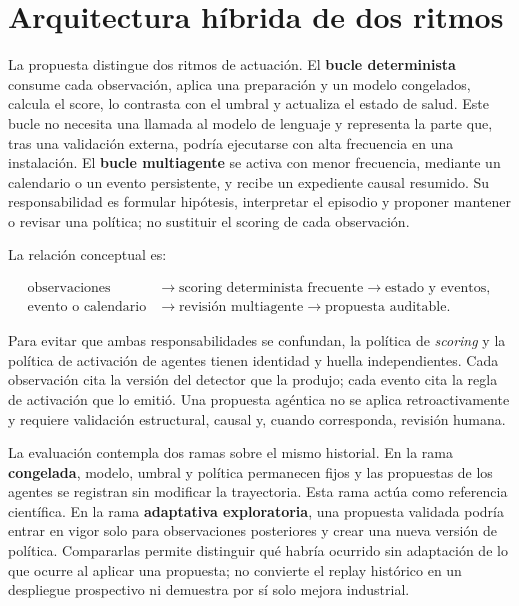 \section{Arquitectura híbrida de dos ritmos}

La propuesta distingue dos ritmos de actuación. El \textbf{bucle
determinista} consume cada observación, aplica una preparación y un modelo
congelados, calcula el score, lo contrasta con el umbral y actualiza el estado
de salud. Este bucle no necesita una llamada al modelo de lenguaje y representa
la parte que, tras una validación externa, podría ejecutarse con alta frecuencia
en una instalación. El \textbf{bucle multiagente} se activa con menor
frecuencia, mediante un calendario o un evento persistente, y recibe un
expediente causal resumido. Su responsabilidad es formular hipótesis,
interpretar el episodio y proponer mantener o revisar una política; no sustituir
el scoring de cada observación.

La relación conceptual es:

\[
\begin{aligned}
\text{observaciones} &\longrightarrow
\text{scoring determinista frecuente}
\longrightarrow \text{estado y eventos}, \\
\text{evento o calendario} &\longrightarrow
\text{revisión multiagente}
\longrightarrow \text{propuesta auditable}.
\end{aligned}
\]

Para evitar que ambas responsabilidades se confundan, la política de
\emph{scoring} y la política de activación de agentes tienen identidad y
huella independientes. Cada observación cita la versión del detector que la
produjo; cada evento cita la regla de activación que lo emitió. Una propuesta
agéntica no se aplica retroactivamente y requiere validación estructural,
causal y, cuando corresponda, revisión humana.

La evaluación contempla dos ramas sobre el mismo historial. En la rama
\textbf{congelada}, modelo, umbral y política permanecen fijos y las
propuestas de los agentes se registran sin modificar la trayectoria. Esta rama
actúa como referencia científica. En la rama \textbf{adaptativa
exploratoria}, una propuesta validada podría entrar en vigor solo para
observaciones posteriores y crear una nueva versión de política. Compararlas
permite distinguir qué habría ocurrido sin adaptación de lo que ocurre al
aplicar una propuesta; no convierte el replay histórico en un despliegue
prospectivo ni demuestra por sí solo mejora industrial.

